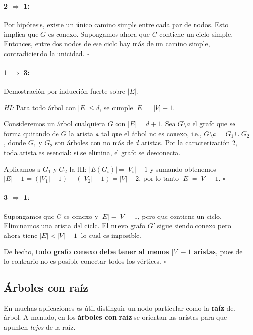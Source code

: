 \paragraph{2 $\Rightarrow$ 1:} Por hipótesis, existe un único camino simple entre cada par de nodos. Esto implica que $G$ es conexo. Supongamos ahora que $G$ contiene un ciclo simple. Entonces, entre dos nodos de ese ciclo hay más de un camino simple, contradiciendo la unicidad. \hfill $\square$

\paragraph{1 $\Rightarrow$ 3:} Demostración por inducción fuerte sobre $|E|$.

\textit{HI:} Para todo árbol con $|E| \leq d$, se cumple $|E| = |V| - 1$.

Consideremos un árbol cualquiera $G$ con $|E| = d + 1$.  Sea  $G\setminus{a}$ el grafo que se forma quitando de $G$ la arista $a$ tal que el árbol no es conexo,  i.e.,  $G\setminus{a}= G_1 \cup G_2$,  donde $G_1$ y $G_2$ son árboles con no más de $d$ aristas.
Por la caracterización 2, toda arista es esencial: si se elimina, el grafo se desconecta.

Aplicamos a $G_1$ y $G_2$ la HI: $|E(G_i)|=|V_i|-1$ y sumando obtenemos  $|E| - 1 = (|V_1| - 1) + (|V_2| - 1) = |V| - 2$, por lo tanto $|E| = |V| - 1$.
\hfill $\square$

\paragraph{3 $\Rightarrow$ 1:} Supongamos que $G$ es conexo y $|E| = |V| - 1$, pero que contiene un ciclo. Eliminamos una arista del ciclo. El nuevo grafo $G'$ sigue siendo conexo pero ahora tiene $|E| < |V| - 1$,  lo cual es imposible.

De hecho, \textbf{todo grafo conexo debe tener al menos $|V| - 1$ aristas}, pues de lo contrario no es posible conectar todos los vértices.
\hfill $\square$


\subsection{Árboles con raíz}

En muchas aplicaciones es útil distinguir un nodo particular como la \textbf{raíz} del árbol. A menudo, en los \textbf{árboles con raíz} se orientan las aristas para que apunten \emph{lejos} de la raíz.

